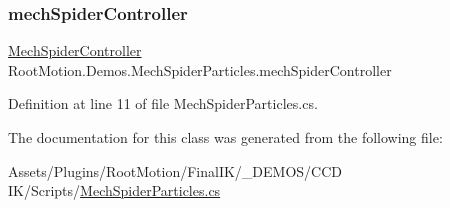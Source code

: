\subsubsection{\texorpdfstring{mech\+Spider\+Controller}{mechSpiderController}}
{\footnotesize\ttfamily \mbox{\hyperlink{class_root_motion_1_1_demos_1_1_mech_spider_controller}{Mech\+Spider\+Controller}} Root\+Motion.\+Demos.\+Mech\+Spider\+Particles.\+mech\+Spider\+Controller}



Definition at line 11 of file Mech\+Spider\+Particles.\+cs.



The documentation for this class was generated from the following file\+:\begin{DoxyCompactItemize}
\item 
Assets/\+Plugins/\+Root\+Motion/\+Final\+I\+K/\+\_\+\+D\+E\+M\+O\+S/\+C\+C\+D I\+K/\+Scripts/\mbox{\hyperlink{_mech_spider_particles_8cs}{Mech\+Spider\+Particles.\+cs}}\end{DoxyCompactItemize}
